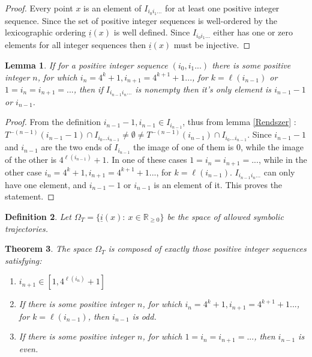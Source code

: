 \documentclass{article}
\newtheorem{theorem}{Theorem}[section]
\newtheorem{lemma}[theorem]{Lemma}
\newtheorem{defin}[theorem]{Definition}
\begin{document}
\begin{proof}
Every point $x$ is an element of $I_{i_0i_1...}$ for at least one positive integer sequence. Since the set of positive integer sequences is well-ordered by the  lexicographic ordering $\underline{i}(x)$ is well defined. Since $I_{i_0i_1...}$ either has one or zero elements for all integer sequences then $\underline{i}(x)$ must be injective.
\end{proof}

\begin{lemma} \label{egesz}
If for a positive integer sequence $(i_0, i_1 ...)$ there is some positive integer $n$, for which $i_n = 4^k +1, i_{n+1} = 4^{k+1}+1 ...$, for $k= \ell(i_{n-1})$ or $1 = i_n = i_{n+1} = ...$, then if $I_{i_{n-1}i_{n}...}$ is nonempty then it's only element is $i_{n-1}-1$ or $i_{n-1}$.
\end{lemma}

\begin{proof}
From the definition $i_{n-1}-1,i_{n-1} \in I_{i_{n-1}}$, thus from lemma \ref{Rendszer}  : $T^{-(n-1)}(i_{n-1}-1) \cap I_{i_0...i_{n-1}} \neq \emptyset \neq T^{-(n-1)}(i_{n-1}) \cap I_{i_0...i_{n-1}}$. Since $i_{n-1}-1$ and $i_{n-1}$ are the two ends of $I_{i_{n-1}}$ the image of one of them is 0, while the image of the other is $4^{\ell(i_{n-1})}+1$. In one of these cases $1 = i_n = i_{n+1} = ...$, while in the other case $i_n = 4^k +1, i_{n+1} = 4^{k+1}+1 ...$, for $k= \ell(i_{n-1})$. $I_{i_{n-1}i_{n}...}$ can only have one element, and $i_{n-1}-1$ or $i_{n-1}$ is an element of it. This proves the statement.
\end{proof}

\begin{defin}
Let $\Omega_T = \{\underline{i}(x):\: x \in \mathbb{R}_{\geq 0}\}$ be the space of allowed symbolic trajectories.
\end{defin}

\begin{theorem}
The space $\Omega_T$ is composed of exactly those positive integer sequences satisfying:

\begin{enumerate}
	\item $i_{n+1} \in [1, 4^{\ell(i_{n})}+1]$
	\item If there is some positive integer $n$, for which $i_n = 4^k +1, i_{n+1} = 4^{k+1}+1 ...$, for $k= \ell(i_{n-1})$, then $i_{n-1}$ is odd. 
	\item If there is some positive integer $n$, for which $1 = i_n = i_{n+1} = ...$, then $i_{n-1}$ is even.
\end{enumerate}
\end{theorem}
\end{document}
